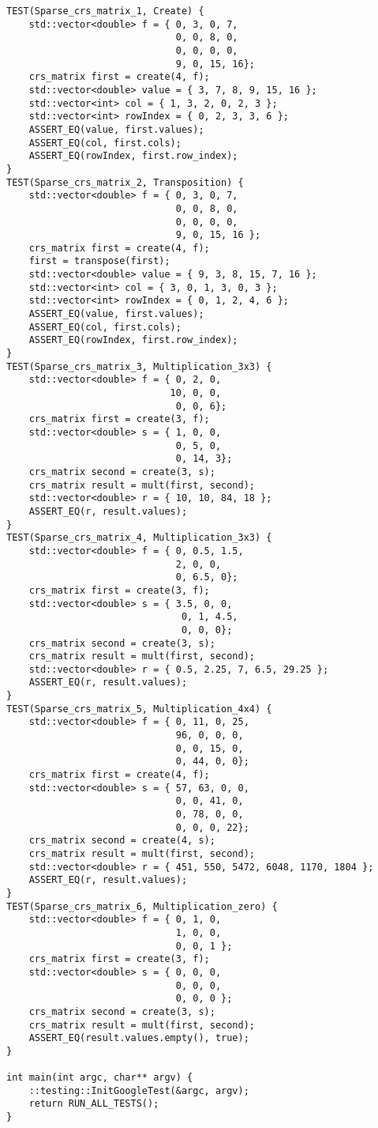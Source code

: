 \documentclass{report}
\begin{document}
\begin{lstlisting}
TEST(Sparse_crs_matrix_1, Create) {
    std::vector<double> f = { 0, 3, 0, 7,
                              0, 0, 8, 0,
                              0, 0, 0, 0,
                              9, 0, 15, 16};
    crs_matrix first = create(4, f);
    std::vector<double> value = { 3, 7, 8, 9, 15, 16 };
    std::vector<int> col = { 1, 3, 2, 0, 2, 3 };
    std::vector<int> rowIndex = { 0, 2, 3, 3, 6 };
    ASSERT_EQ(value, first.values);
    ASSERT_EQ(col, first.cols);
    ASSERT_EQ(rowIndex, first.row_index);
}
TEST(Sparse_crs_matrix_2, Transposition) {
    std::vector<double> f = { 0, 3, 0, 7,
                              0, 0, 8, 0,
                              0, 0, 0, 0,
                              9, 0, 15, 16 };
    crs_matrix first = create(4, f);
    first = transpose(first);
    std::vector<double> value = { 9, 3, 8, 15, 7, 16 };
    std::vector<int> col = { 3, 0, 1, 3, 0, 3 };
    std::vector<int> rowIndex = { 0, 1, 2, 4, 6 };
    ASSERT_EQ(value, first.values);
    ASSERT_EQ(col, first.cols);
    ASSERT_EQ(rowIndex, first.row_index);
}
TEST(Sparse_crs_matrix_3, Multiplication_3x3) {
    std::vector<double> f = { 0, 2, 0,
                             10, 0, 0,
                              0, 0, 6};
    crs_matrix first = create(3, f);
    std::vector<double> s = { 1, 0, 0,
                              0, 5, 0,
                              0, 14, 3};
    crs_matrix second = create(3, s);
    crs_matrix result = mult(first, second);
    std::vector<double> r = { 10, 10, 84, 18 };
    ASSERT_EQ(r, result.values);
}
TEST(Sparse_crs_matrix_4, Multiplication_3x3) {
    std::vector<double> f = { 0, 0.5, 1.5,
                              2, 0, 0,
                              0, 6.5, 0};
    crs_matrix first = create(3, f);
    std::vector<double> s = { 3.5, 0, 0,
                               0, 1, 4.5,
                               0, 0, 0};
    crs_matrix second = create(3, s);
    crs_matrix result = mult(first, second);
    std::vector<double> r = { 0.5, 2.25, 7, 6.5, 29.25 };
    ASSERT_EQ(r, result.values);
}
TEST(Sparse_crs_matrix_5, Multiplication_4x4) {
    std::vector<double> f = { 0, 11, 0, 25,
                              96, 0, 0, 0,
                              0, 0, 15, 0,
                              0, 44, 0, 0};
    crs_matrix first = create(4, f);
    std::vector<double> s = { 57, 63, 0, 0,
                              0, 0, 41, 0,
                              0, 78, 0, 0,
                              0, 0, 0, 22};
    crs_matrix second = create(4, s);
    crs_matrix result = mult(first, second);
    std::vector<double> r = { 451, 550, 5472, 6048, 1170, 1804 };
    ASSERT_EQ(r, result.values);
}
TEST(Sparse_crs_matrix_6, Multiplication_zero) {
    std::vector<double> f = { 0, 1, 0,
                              1, 0, 0,
                              0, 0, 1 };
    crs_matrix first = create(3, f);
    std::vector<double> s = { 0, 0, 0,
                              0, 0, 0,
                              0, 0, 0 };
    crs_matrix second = create(3, s);
    crs_matrix result = mult(first, second);
    ASSERT_EQ(result.values.empty(), true);
}

int main(int argc, char** argv) {
    ::testing::InitGoogleTest(&argc, argv);
    return RUN_ALL_TESTS();
}

\end{lstlisting}
\end{document}
